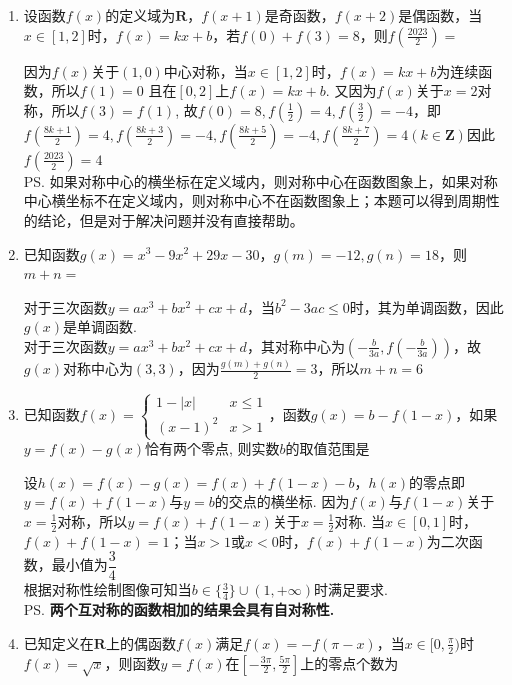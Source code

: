 \begin{enumerate}
    \item 设函数$f(x)$的定义域为$\mathbf{R}$，$f(x+1)$是奇函数，$f(x+2)$是偶函数，当$x \in [1, 2]$时，$f(x) = kx+b$，若$f(0) + f(3) = 8$，则$f(\frac{2023}{2}) = $
    \begin{jieda}
    因为$f(x)$关于$(1, 0)$中心对称，当$x \in [1, 2]$时，$f(x) = kx+b$为连续函数，所以$f(1) = 0$ 且在$[0, 2]$上$f(x) = kx+b$. 又因为$f(x)$关于$x = 2$对称，所以$f(3) = f(1)$, 故$f(0) = 8, f(\frac{1}{2}) = 4, f(\frac{3}{2}) = -4$，即$f(\frac{8k+1}{2}) = 4, f(\frac{8k+3}{2}) = -4, f(\frac{8k+5}{2}) = -4, f(\frac{8k+7}{2}) = 4 (k \in \mathbf{Z})$因此$f(\frac{2023}{2}) = 4$ \\
    \ps 如果对称中心的横坐标在定义域内，则对称中心在函数图象上，如果对称中心横坐标不在定义域内，则对称中心不在函数图象上；本题可以得到周期性的结论，但是对于解决问题并没有直接帮助。
    \end{jieda}
    \item 已知函数$g(x) = x^3 - 9x^2 + 29x - 30$，$g(m) = -12, g(n) = 18$，则$m+n = $
    \begin{jieda}
        对于三次函数$y = ax^3+bx^2+cx+d$，当$b^2 - 3ac \leq 0$时，其为单调函数，因此$g(x)$是单调函数. \\
        对于三次函数$y = ax^3+bx^2+cx+d$，其对称中心为$(-\frac{b}{3a}, f(-\frac{b}{3a}))$，故$g(x)$对称中心为$(3, 3)$，因为$\frac{g(m) + g(n)}{2} = 3$，所以$m+n = 6$
    \end{jieda}
    \item 已知函数$f(x) = \left \{ \begin{array}{ll}
        1 - |x| & x \leq 1 \\
        (x-1)^2 & x > 1
    \end{array}\right.$，函数$g(x) = b - f(1-x)$，如果$y = f(x) - g(x)$恰有两个零点, 则实数$b$的取值范围是
    \begin{jieda}
        设$h(x) = f(x) - g(x) = f(x) + f(1-x) - b$，$h(x)$的零点即$y = f(x) + f(1-x)$与$y = b$的交点的横坐标. 因为$f(x)$与$f(1-x)$关于$x = \frac{1}{2}$对称，所以$y = f(x) + f(1-x)$关于$x = \frac{1}{2}$对称. 当$x \in [0, 1]$时，$f(x) + f(1-x) = 1$；当$x > 1$或$x < 0$时，$f(x) + f(1-x)$为二次函数，最小值为$\dfrac{3}{4}$ \\
        根据对称性绘制图像可知当$b \in \{\frac{3}{4}\} \cup (1, +\infty)$时满足要求. \\
        \ps \textbf{两个互对称的函数相加的结果会具有自对称性.}
    \end{jieda}
    \item 已知定义在$\mathbf{R}$上的偶函数$f(x)$满足$f(x) = -f(\pi - x)$，当$x \in [0, \frac{\pi}{2})$时$f(x) = \sqrt{x}$，则函数$y = f(x)$在$[-\frac{3\pi}{2}, \frac{5\pi}{2}]$上的零点个数为

\end{enumerate}
